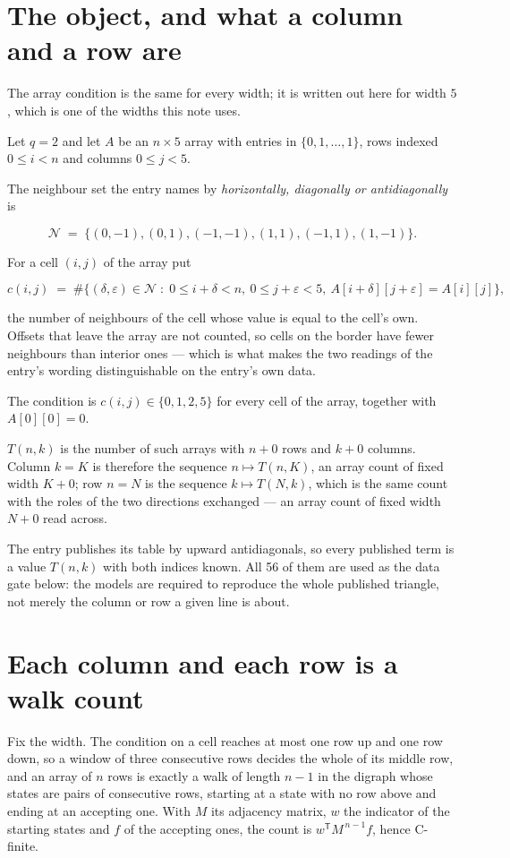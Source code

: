 \documentclass[11pt]{article}
\theoremstyle{definition}
\begin{document}
\section{The object, and what a column and a row are}

The array condition is the same for every width; it is written out here for width $5$, which is one of the widths this note uses.

Let $q = 2$ and let $A$ be an $n \times 5$ array with entries in $\{0,1,\dots,1\}$, rows indexed $0 \le i < n$ and columns $0 \le j < 5$.

The neighbour set the entry names by {\itshape horizontally, diagonally or antidiagonally} is

\[\mathcal{N} \;=\; \{(0,-1), (0,1), (-1,-1), (1,1), (-1,1), (1,-1)\}.\]

For a cell $(i,j)$ of the array put

\[c(i,j) \;=\; \#\bigl\{(\delta,\varepsilon)\in\mathcal{N} \;:\; 0\le i+\delta<n,\ 0\le j+\varepsilon<5,\ A[i+\delta][j+\varepsilon] = A[i][j]\bigr\},\]

the number of neighbours of the cell whose value is equal to the cell's own. Offsets that leave the array are not counted, so cells on the border have fewer neighbours than interior ones --- which is what makes the two readings of the entry's wording distinguishable on the entry's own data.

The condition is $c(i,j) \in \{0, 1, 2, 5\}$ for every cell of the array, together with $A[0][0]=0$.

$T(n,k)$ is the number of such arrays with $n + 0$ rows and $k + 0$ columns. Column $k = K$ is therefore the sequence $n \mapsto T(n,K)$, an array count of fixed width $K + 0$; row $n = N$ is the sequence $k \mapsto T(N,k)$, which is the same count with the roles of the two directions exchanged --- an array count of fixed width $N + 0$ read across.

The entry publishes its table by upward antidiagonals, so every published term is a value $T(n,k)$ with both indices known. All 56 of them are used as the data gate below: the models are required to reproduce the whole published triangle, not merely the column or row a given line is about.

\section{Each column and each row is a walk count}

Fix the width. The condition on a cell reaches at most one row up and one row down, so a window of three consecutive rows decides the whole of its middle row, and an array of $n$ rows is exactly a walk of length $n-1$ in the digraph whose states are pairs of consecutive rows, starting at a state with no row above and ending at an accepting one. With $M$ its adjacency matrix, $w$ the indicator of the starting states and $f$ of the accepting ones, the count is $w^{\mathsf T}M^{\,n-1}f$, hence C-finite.
\end{document}
